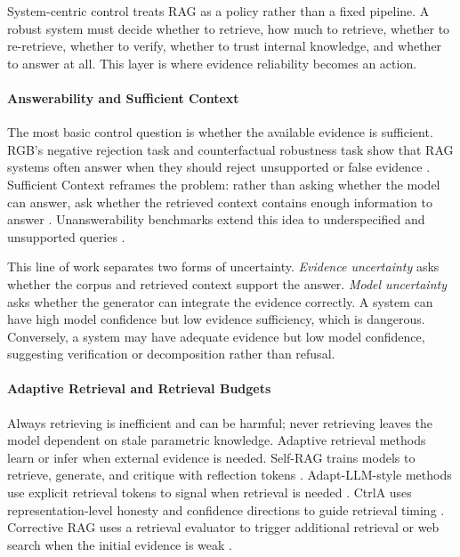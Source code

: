 
System-centric control treats RAG as a policy rather than a fixed pipeline. A robust system must decide whether to retrieve, how much to retrieve, whether to re-retrieve, whether to verify, whether to trust internal knowledge, and whether to answer at all. This layer is where evidence reliability becomes an action.




\paragraph{Answerability and Sufficient Context}

The most basic control question is whether the available evidence is sufficient. RGB's negative rejection task and counterfactual robustness task show that RAG systems often answer when they should reject unsupported or false evidence \citep{rgb2023}. Sufficient Context reframes the problem: rather than asking whether the model can answer, ask whether the retrieved context contains enough information to answer \citep{sufficientContext2024}. Unanswerability benchmarks extend this idea to underspecified and unsupported queries \citep{rrag111,rrag141}.

This line of work separates two forms of uncertainty. \emph{Evidence uncertainty} asks whether the corpus and retrieved context support the answer. \emph{Model uncertainty} asks whether the generator can integrate the evidence correctly. A system can have high model confidence but low evidence sufficiency, which is dangerous. Conversely, a system may have adequate evidence but low model confidence, suggesting verification or decomposition rather than refusal.

\paragraph{Adaptive Retrieval and Retrieval Budgets}

Always retrieving is inefficient and can be harmful; never retrieving leaves the model dependent on stale parametric knowledge. Adaptive retrieval methods learn or infer when external evidence is needed. Self-RAG trains models to retrieve, generate, and critique with reflection tokens \citep{selfRAG2023}. Adapt-LLM-style methods use explicit retrieval tokens to signal when retrieval is needed \citep{whenToRetrieve2024}. CtrlA uses representation-level honesty and confidence directions to guide retrieval timing \citep{ctrla2025}. Corrective RAG uses a retrieval evaluator to trigger additional retrieval or web search when the initial evidence is weak \citep{crag2024}.


